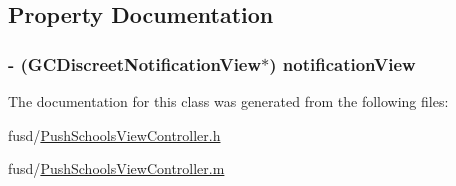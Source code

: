 \subsection{\-Property \-Documentation}
\hypertarget{interface_push_schools_view_controller_aa8ddb5e5759527882b547052bd676204}{
\subsubsection[{notification\-View}]{\setlength{\rightskip}{0pt plus 5cm}-\/ (\-G\-C\-Discreet\-Notification\-View$\ast$) notification\-View}}
\label{interface_push_schools_view_controller_aa8ddb5e5759527882b547052bd676204}


\-The documentation for this class was generated from the following files\-:\begin{DoxyCompactItemize}
\item 
fusd/\hyperlink{_push_schools_view_controller_8h}{\-Push\-Schools\-View\-Controller.\-h}\item 
fusd/\hyperlink{_push_schools_view_controller_8m}{\-Push\-Schools\-View\-Controller.\-m}\end{DoxyCompactItemize}
